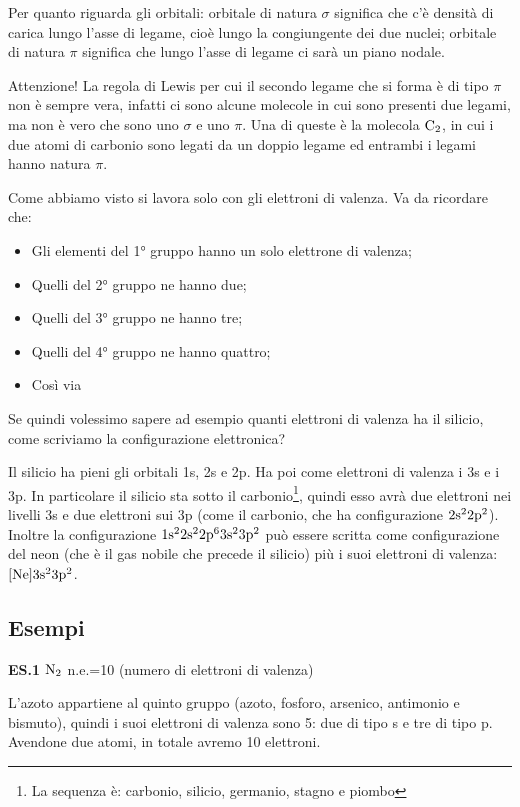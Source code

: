 Per quanto riguarda gli orbitali: orbitale di natura $\sigma$ significa che c'è densità di carica lungo l'asse di legame, cioè lungo la congiungente dei due nuclei; orbitale di natura $\pi$ significa che lungo l'asse di legame ci sarà un piano nodale.

Attenzione! La regola di Lewis per cui il secondo legame che si forma è di tipo $\pi$ non è sempre vera, infatti ci sono alcune molecole in cui sono presenti due legami, ma non è vero che sono uno $\sigma$ e uno $\pi$. Una di queste è la molecola $\rm C_2$, in cui i due atomi di carbonio sono legati da un doppio legame ed entrambi i legami hanno natura $\pi$.

Come abbiamo visto si lavora solo con gli elettroni di valenza. Va da ricordare che:
\begin{itemize}
    \item Gli elementi del 1° gruppo hanno un solo elettrone di valenza;
    \item Quelli del 2° gruppo ne hanno due;
    \item Quelli del 3° gruppo ne hanno tre;
    \item Quelli del 4° gruppo ne hanno quattro;
    \item Così via
\end{itemize}

Se quindi volessimo sapere ad esempio quanti elettroni di valenza ha il silicio, come scriviamo la configurazione elettronica?

Il silicio ha pieni gli orbitali 1s, 2s e 2p. Ha poi come elettroni di valenza i 3s e i 3p. In particolare il silicio sta sotto il carbonio\footnote{La sequenza è: carbonio, silicio, germanio, stagno e piombo}, quindi esso avrà due elettroni nei livelli 3s e due elettroni sui 3p (come il carbonio, che ha configurazione $\rm 2s^22p^2$). Inoltre la configurazione $\rm 1s^22s^22p^63s^23p^2$ può essere scritta come configurazione del neon (che è il gas nobile che precede il silicio) più i suoi elettroni di valenza: $\rm [Ne]3s^23p^2$.

\subsection{Esempi}
    \textbf{ES.1} $\rm N_2$ \quad n.e.=10 (numero di elettroni di valenza)
    
    L'azoto appartiene al quinto gruppo (azoto, fosforo, arsenico, antimonio e bismuto), quindi i suoi elettroni di valenza sono 5: due di tipo s e tre di tipo p. Avendone due atomi, in totale avremo 10 elettroni.

